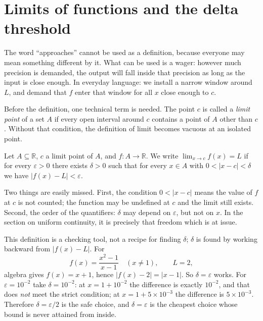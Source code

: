 \section{Limits of functions and the delta threshold}

The word ``approaches'' cannot be used as a definition, because everyone may mean
something different by it. What can be used is a wager: however much precision is
demanded, the output will fall inside that precision as long as the input is close
enough. In everyday language: we install a narrow window around $L$, and demand that $f$
enter that window for all $x$ close enough to $c$.


Before the definition, one technical term is needed. The point $c$ is called a
\emph{limit point} of a set $A$ if every open interval around $c$
contains a point of $A$ other than $c$. Without that condition, the definition of limit
becomes vacuous at an isolated point.

\begin{definisi}
Let $A\subseteq\mathbb{R}$, $c$ a limit point of $A$, and $f\colon A\to\mathbb{R}$.
We write $\lim_{x\to c}f(x)=L$ if for every $\varepsilon>0$ there exists
$\delta>0$ such that for every $x\in A$ with $0<|x-c|<\delta$ we have
$|f(x)-L|<\varepsilon$.
\end{definisi}

Two things are easily missed. First, the condition $0<|x-c|$ means the value of $f$ at
$c$ is not counted; the function may be undefined at $c$ and the limit still exists.
Second, the order of the quantifiers: $\delta$ may depend on $\varepsilon$, but not on
$x$. In the section on uniform continuity, it is precisely that freedom which is at
issue.

This definition is a checking tool, not a recipe for finding $\delta$; $\delta$ is found
by working backward from $|f(x)-L|$. For
\[
f(x)=\frac{x^{2}-1}{x-1}\quad (x\neq 1),\qquad L=2,
\]
algebra gives $f(x)=x+1$, hence $|f(x)-2|=|x-1|$. So $\delta=\varepsilon$
works. For $\varepsilon=10^{-2}$ take $\delta=10^{-2}$: at $x=1+10^{-2}$ the
difference is exactly $10^{-2}$, and that does \emph{not} meet the strict condition; at
$x=1+5\times10^{-3}$ the difference is $5\times10^{-3}$. Therefore $\delta=\varepsilon/2$ is the safe
choice, and $\delta=\varepsilon$ is the cheapest choice whose bound is never
attained from inside.

